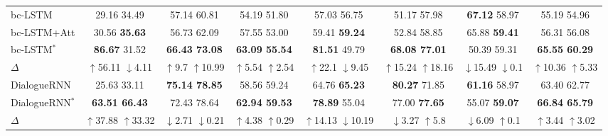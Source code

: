 {{\begin{table*}[!t]
{\begin{tabular}{l|ccccccc}
			
			bc-LSTM \cite{poria2017context}                 & 29.16  34.49 & 57.14  60.81 & 54.19  51.80 & 57.03  56.75 & 51.17  57.98 &\textbf{ 67.12}  58.97 & 55.19  54.96 \\
			bc-LSTM+Att \cite{poria2017context} & 30.56 \textbf{35.63} & 56.73 62.09 & 57.55 53.00 & {59.41} \textbf{59.24} & 52.84 58.85 & 65.88 \textbf{59.41} & 56.31 56.08  \\
			\rowcolor{gray!30}
			bc-LSTM$^\ast$ & \textbf{86.67} 31.52 & \textbf{66.43 73.08} & \textbf{63.09 55.54} & \textbf{81.51} 49.79 & \textbf{68.08 77.01} & 50.39 59.31 & \textbf{65.55 60.29}\\ 
			$\Delta$ &  \textcolor[rgb]{0.0,0.6,0.0}{$\uparrow$56.11} \textcolor[rgb]{0.2,0.2,0.2}{$\downarrow$4.11}  & \textcolor[rgb]{0.0,0.6,0.0}{$\uparrow$9.7} \textcolor[rgb]{0.0,0.6,0.0}{$\uparrow$10.99}   & \textcolor[rgb]{0.0,0.6,0.0}{$\uparrow$5.54} \textcolor[rgb]{0.0,0.6,0.0}{$\uparrow$2.54}   & \textcolor[rgb]{0.0,0.6,0.0}{$\uparrow$22.1} \textcolor[rgb]{0.2,0.2,0.2}{$\downarrow$9.45}   & \textcolor[rgb]{0.0,0.6,0.0}{$\uparrow$15.24} \textcolor[rgb]{0.0,0.6,0.0}{$\uparrow$18.16}  & \textcolor[rgb]{0.2,0.2,0.2}{$\downarrow$15.49} \textcolor[rgb]{0.2,0.2,0.2}{$\downarrow$0.1}  & \textcolor[rgb]{0.0,0.6,0.0}{$\uparrow$10.36} \textcolor[rgb]{0.0,0.6,0.0}{$\uparrow$5.33} \\ \hline
			
			
			DialogueRNN   \cite{majumder2019dialoguernn}           & 25.63  33.11 & \textbf{75.14  78.85} & 58.56  {59.24} & 64.76 \textbf{65.23} & \textbf{80.27}  71.85 & \textbf{61.16}  58.97 & 63.40  62.77 \\
			\rowcolor{gray!30}
			DialogueRNN$^\ast$ & \textbf{63.51 66.43} & 72.43 78.64 & \textbf{62.94 59.53} & \textbf{78.89} 55.04 & 77.00 \textbf{77.65} & 55.07 \textbf{59.07} & \textbf{66.84 65.79}\\ 
			$\Delta$ & \textcolor[rgb]{0.0,0.6,0.0}{$\uparrow$37.88} \textcolor[rgb]{0.0,0.6,0.0}{$\uparrow$33.32}   & \textcolor[rgb]{0.2,0.2,0.2}{$\downarrow$2.71} \textcolor[rgb]{0.2,0.2,0.2}{$\downarrow$0.21}   & \textcolor[rgb]{0.2,0.2,0.2}{$\uparrow$4.38} \textcolor[rgb]{0.0,0.6,0.0}{$\uparrow$0.29}   &  \textcolor[rgb]{0.0,0.6,0.0}{$\uparrow$14.13} \textcolor[rgb]{0.2,0.2,0.2}{$\downarrow$10.19}  & \textcolor[rgb]{0.2,0.2,0.2}{$\downarrow$3.27} \textcolor[rgb]{0.2,0.2,0.2}{$\uparrow$5.8}  & \textcolor[rgb]{0.2,0.2,0.2}{$\downarrow$6.09} \textcolor[rgb]{0.2,0.2,0.2}{$\uparrow$0.1}  & \textcolor[rgb]{0.0,0.6,0.0}{$\uparrow$3.44} \textcolor[rgb]{0.0,0.6,0.0}{$\uparrow$3.02}  \\  \hline
			

\end{tabular}}
\end{table*}}}
